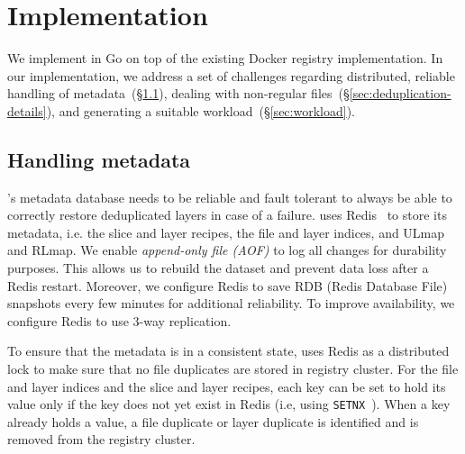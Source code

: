 \section{Implementation}
\label{sec:impl}

We implement \sysname in Go on top of the existing Docker registry implementation. In our implementation,
we address a set of challenges regarding distributed, reliable handling of
metadata~(\S\ref{sec:handling-metadata}), dealing with non-regular files~(\S\ref{sec:deduplication-details}),
and generating a suitable workload~(\S\ref{sec:workload}).

\subsection{Handling metadata}
\label{sec:handling-metadata}

\sysname{}'s metadata database needs to be reliable and fault tolerant to always be
able to correctly restore deduplicated layers in case of a failure.
%
\sysname uses Redis~\cite{redis} to store its metadata, i.e.
the slice and layer recipes, the file and layer indices, and ULmap and RLmap.
%
We enable \emph{append-only file (AOF)} to log all changes for durability purposes.
This allows us to rebuild the dataset and prevent data loss after a Redis restart.
%
Moreover, we configure Redis to save RDB (Redis Database File) snapshots every few minutes for additional
reliability. To improve availability, we configure Redis to use 3-way replication.


%
To ensure that the metadata is in a consistent state, \sysname uses Redis as a distributed
lock to make sure that no file duplicates are stored in registry cluster.
%
For the file and layer indices and the slice and layer recipes,
each key can be set to hold its value only if
the key does not yet exist in Redis (i.e, using \texttt{SETNX}~\cite{SETNX}).
%
When a key already holds a value, a file duplicate or
layer duplicate is identified and is removed from the registry cluster.

